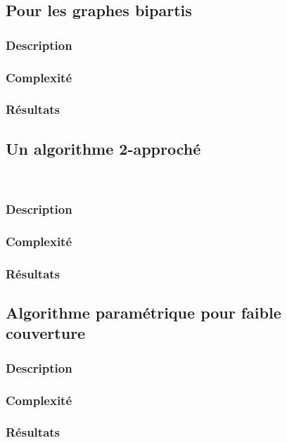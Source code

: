 \documentclass[a4paper,10pt]{article}
\begin{document}
\subsection{Pour les graphes bipartis}

\subsubsection{Description}

\subsubsection{Complexité}

\subsubsection{Résultats}


\subsection{Un algorithme 2-approché}
\ 
\subsubsection{Description}

\subsubsection{Complexité}

\subsubsection{Résultats}


\subsection{Algorithme paramétrique pour faible couverture}

\subsubsection{Description}

\subsubsection{Complexité}

\subsubsection{Résultats}
\end{document}
